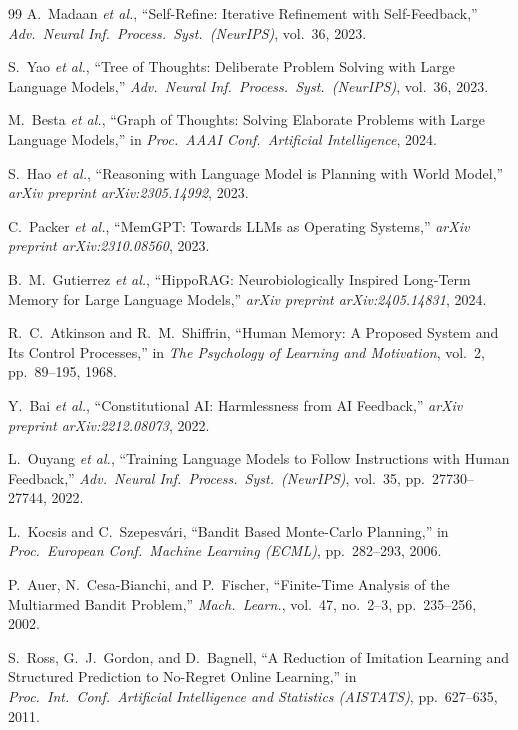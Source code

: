 \documentclass[10pt,conference]{IEEEtran}
\theoremstyle{ieeethm}
\theoremstyle{ieeedef}
\theoremstyle{ieeeremark}
\begin{document}
\begin{thebibliography}{99}
A.~Madaan \textit{et al.},
``Self-Refine: Iterative Refinement with Self-Feedback,''
\textit{Adv.\ Neural Inf.\ Process.\ Syst.\ (NeurIPS)}, vol.~36, 2023.

S.~Yao \textit{et al.},
``Tree of Thoughts: Deliberate Problem Solving with Large Language Models,''
\textit{Adv.\ Neural Inf.\ Process.\ Syst.\ (NeurIPS)}, vol.~36, 2023.

M.~Besta \textit{et al.},
``Graph of Thoughts: Solving Elaborate Problems with Large Language Models,''
in \textit{Proc.\ AAAI Conf.\ Artificial Intelligence}, 2024.

S.~Hao \textit{et al.},
``Reasoning with Language Model is Planning with World Model,''
\textit{arXiv preprint arXiv:2305.14992}, 2023.

C.~Packer \textit{et al.},
``MemGPT: Towards LLMs as Operating Systems,''
\textit{arXiv preprint arXiv:2310.08560}, 2023.

B.~M.~Gutierrez \textit{et al.},
``HippoRAG: Neurobiologically Inspired Long-Term Memory for Large Language Models,''
\textit{arXiv preprint arXiv:2405.14831}, 2024.

R.~C.~Atkinson and R.~M.~Shiffrin,
``Human Memory: A Proposed System and Its Control Processes,''
in \textit{The Psychology of Learning and Motivation}, vol.~2, pp.~89--195, 1968.

Y.~Bai \textit{et al.},
``Constitutional AI: Harmlessness from AI Feedback,''
\textit{arXiv preprint arXiv:2212.08073}, 2022.

L.~Ouyang \textit{et al.},
``Training Language Models to Follow Instructions with Human Feedback,''
\textit{Adv.\ Neural Inf.\ Process.\ Syst.\ (NeurIPS)}, vol.~35, pp.~27730--27744, 2022.

L.~Kocsis and C.~Szepesv\'{a}ri,
``Bandit Based Monte-Carlo Planning,''
in \textit{Proc.\ European Conf.\ Machine Learning (ECML)}, pp.~282--293, 2006.

P.~Auer, N.~Cesa-Bianchi, and P.~Fischer,
``Finite-Time Analysis of the Multiarmed Bandit Problem,''
\textit{Mach.\ Learn.}, vol.~47, no.~2--3, pp.~235--256, 2002.

S.~Ross, G.~J.~Gordon, and D.~Bagnell,
``A Reduction of Imitation Learning and Structured Prediction to No-Regret Online Learning,''
in \textit{Proc.\ Int.\ Conf.\ Artificial Intelligence and Statistics (AISTATS)}, pp.~627--635, 2011.


\end{thebibliography}
\end{document}
